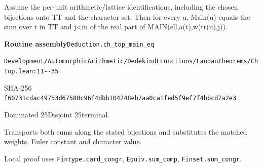 
\begin{formalstatement}[D569]\label{decomp:D569}
Assume the per-unit arithmetic/lattice identifications, including the chosen bijections onto TT and the character set. Then for every u, Main(u) equals the sum over t in TT and j<m of the real part of MAIN(ell,a(t),w(tr(u),j)).
\end{formalstatement}
{\small\raggedright\noindent\textsf{\bfseries Routine assembly}\quad \nolinkurl{Deduction.ch_top_main_eq}\par\noindent \nolinkurl{Development/AutomorphicArithmetic/DedekindLFunctions/LandauTheorems/ChTop.lean:11--35}\par\noindent SHA-256 \nolinkurl{f60731cdac49753d67580c96f4dbb104248eb7aa0ca1fed5f9ef7f4bbcd7a2e3}\par\noindent Dominated 25\quad Disjoint 25\quad terminal.\par}
Transports both sums along the stated bijections and substitutes the matched weights, Euler constant and character value.
{\small\raggedright Local proof uses \nolinkurl{Fintype.card_congr}, \nolinkurl{Equiv.sum_comp}, \nolinkurl{Finset.sum_congr}.\par}
